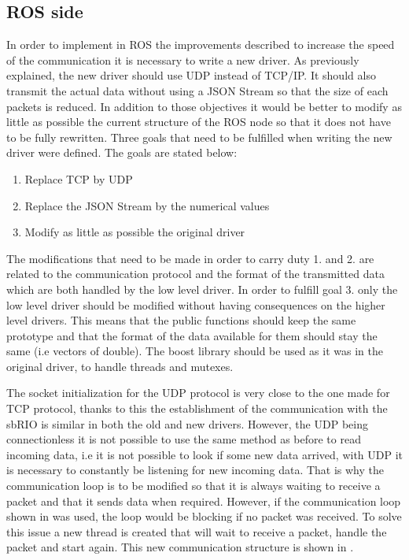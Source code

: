 \subsection{ROS side}

In order to implement in ROS the improvements described to increase the speed of the communication it is necessary to write a new driver. As previously explained, the new driver should use \gls{UDP} instead of TCP/IP. It should also transmit the actual data without using a \gls{JSON} Stream so that the size of each packets is reduced. In addition to those objectives it would be better to modify as little as possible the current structure of the ROS node so that it does not have to be fully rewritten. 
Three goals that need to be fulfilled when writing the new driver were defined. The goals are stated below:
\begin{enumerate}
	\item Replace TCP by UDP
	\item Replace the \gls{JSON} Stream by the numerical values
	\item Modify as little as possible the original driver
\end{enumerate}

The modifications that need to be made in order to carry duty 1. and 2. are related to the communication protocol and the format of the transmitted data which are both handled by the low level driver. In order to fulfill goal 3. only the low level driver should be modified without having consequences on the higher level drivers. This means that the public functions should keep the same prototype and that the format of the data available for them should stay the same (i.e vectors of double). The boost library should be used as it was in the original driver, to handle threads and mutexes.

The socket initialization for the \gls{UDP} protocol is very close to the one made for TCP protocol, thanks to this the establishment of the communication with the sbRIO is similar in both the old and new drivers. However, the \gls{UDP} being connectionless it is not possible to use the same method as before to read incoming data, i.e it is not possible to look if some new data arrived, with \gls{UDP} it is necessary to constantly be listening for new incoming data. That is why the communication loop is to be modified so that it is always waiting to receive a packet and that it sends data when required. However, if the communication loop shown in  was used, the loop would be blocking if no packet was received. To solve this issue a new thread is created that will wait to receive a packet, handle the packet and start again. This new communication structure is shown in .

